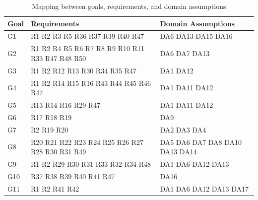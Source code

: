 \begin{table}[H]
  \begin{tabular}{|l|p{9cm}|p{5cm}| }
    \hline
    \textbf{Goal} & \textbf{Requirements} & \textbf{Domain Assumptions}      \\
    \hline
    G1 & R1 R2 R3 R5 R36 R37 R39 R40 R47 & DA6 DA13 DA15 DA16 \\
    \hline
    G2 & R1 R2 R4 R5 R6 R7 R8 R9 R10 R11 R33 R47 R48 R50 & DA6 DA7 DA13 \\
    \hline
    G3 & R1 R2 R12 R13 R30 R34 R35 R47 & DA1 DA12 \\
    \hline
    G4 & R1 R2 R14 R15 R16 R43 R44 R45 R46 R47 & DA1 DA11 DA12 \\
    \hline
    G5 & R13 R14 R16 R29 R47 & DA1 DA11 DA12 \\
    \hline
    G6 & R17 R18 R19 & DA9 \\
    \hline
    G7 & R2 R19 R20 & DA2 DA3 DA4  \\
    \hline
    G8 & R20 R21 R22 R23 R24 R25 R26 R27 R28 R30 R31 R49 & DA5 DA6 DA7 DA8 DA10 DA13 DA14 \\
    \hline
    G9 & R1 R2 R29 R30 R31 R33 R32 R34 R48 & DA1 DA6 DA12 DA13 \\
    \hline
    G10 & R37 R38 R39 R40 R41 R47 & DA16 \\
    \hline
    G11 & R1 R2 R41 R42 & DA1 DA6 DA12 DA13 DA17 \\
    \hline
  \end{tabular}
  \caption{Mapping between goals, requirements, and domain assumptions}
  \label{tab:mapping}
\end{table}

